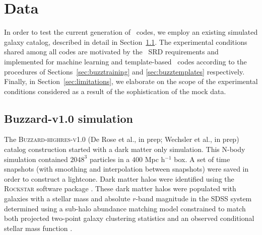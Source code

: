 \section{Data}
\label{sec:sims}

In order to test the current generation of \pzpdf\ codes, we employ an existing simulated galaxy catalog, described in detail in Section~\ref{sec:buzzard}.
The experimental conditions shared among all codes are motivated by the \lsst\ SRD requirements and implemented for machine learning and template-based \pzpdf\ codes according to the procedures of Sections~\ref{sec:buzztraining} and \ref{sec:buzztemplates} respectively.
Finally, in Section~\ref{sec:limitations}, we elaborate on the scope of the experimental conditions considered as a result of the sophistication of the mock data.

\subsection{Buzzard-v1.0 simulation}
\label{sec:buzzard}

The \textsc{Buzzard-highres-v1.0} (De Rose et al., in prep; Wechsler et al., in prep) catalog construction started with a dark matter only simulation.
This N-body simulation contained $2048^3$ particles in a $400$ Mpc h$^{-1}$ box.
A set of time snapshots (with smoothing and interpolation between snapshots) were saved in order to construct a lightcone.
Dark matter halos were identified using the \textsc{Rockstar} software package \citep{Behroozi:13}.
These dark matter halos were populated with galaxies with a stellar mass and absolute $r$-band magnitude in the \textsc{SDSS} system determined using a sub-halo abundance matching model constrained to match both projected two-point galaxy clustering statistics and an observed conditional stellar mass function \citep{Reddick:13}.

